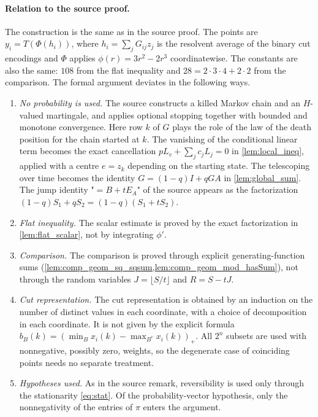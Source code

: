 \documentclass[11pt]{article}
\theoremstyle{definition}
\theoremstyle{remark}
\begin{document}
\paragraph{Relation to the source proof.} The construction is the same as in the source proof. The points are $y_i=T(\Phi(h_i))$, where $h_i=\sum_jG_{ij}z_j$ is the resolvent average of the binary cut encodings and $\Phi$ applies $\phi(r)=3r^2-2r^3$ coordinatewise. The constants are also the same: $108$ from the flat inequality and $28=2\cdot3\cdot4+2\cdot2$ from the comparison. The formal argument deviates in the following ways.
\begin{enumerate}
\item \emph{No probability is used.} The source constructs a killed Markov chain and an $H$-valued martingale, and applies optional stopping together with bounded and monotone convergence. Here row $k$ of $G$ plays the role of the law of the death position for the chain started at $k$. The vanishing of the conditional linear term becomes the exact cancellation $pL_v+\sum_jc_jL_j=0$ in \cref{lem:local_ineq}, applied with a centre $e=z_k$ depending on the starting state. The telescoping over time becomes the identity $G=(1-q)I+qGA$ in \cref{lem:global_sum}. The jump identity "$=B+tE_A$" of the source appears as the factorization $(1-q)S_1+qS_2=(1-q)(S_1+tS_2)$.
\item \emph{Flat inequality.} The scalar estimate is proved by the exact factorization in \cref{lem:flat_scalar}, not by integrating $\phi'$.
\item \emph{Comparison.} The comparison is proved through explicit generating-function sums (\cref{lem:comp_geom_sq_sqsum,lem:comp_geom_mod_hasSum}), not through the random variables $J=\lfloor S/t\rfloor$ and $R=S-tJ$.
\item \emph{Cut representation.} The cut representation is obtained by an induction on the number of distinct values in each coordinate, with a choice of decomposition in each coordinate. It is not given by the explicit formula $b_B(k)=(\min_{B}x_i(k)-\max_{B^c}x_i(k))_+$. All $2^n$ subsets are used with nonnegative, possibly zero, weights, so the degenerate case of coinciding points needs no separate treatment.
\item \emph{Hypotheses used.} As in the source remark, reversibility is used only through the stationarity \eqref{eq:stat}. Of the probability-vector hypothesis, only the nonnegativity of the entries of $\pi$ enters the argument.
\end{enumerate}
\end{document}
